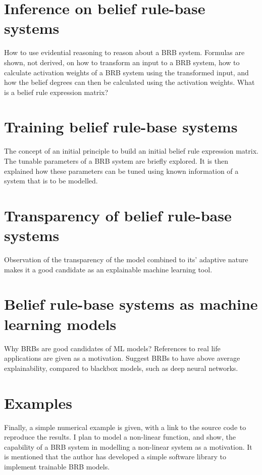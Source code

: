 \section{Inference on belief rule-base systems}
{\color{red}
How to use evidential reasoning to reason about a BRB system. Formulas are shown, not derived, on how to transform an input to a BRB system,
how to calculate activation weights of
a BRB system using the transformed input, and how the belief degrees can then be calculated using the activation weights. What is a belief rule expression matrix?
}

\section{Training belief rule-base systems}
{\color{red}
The concept of an initial principle to build an initial belief rule expression matrix.
The tunable parameters of a BRB system are briefly explored. It is then explained how these parameters can be tuned using known information of
a system that is to be modelled.
}

\section{Transparency of belief rule-base systems}
{\color{red}
Observation of the transparency of the model combined to its' adaptive nature makes it a good candidate as an explainable machine learning tool.
}

\section{Belief rule-base systems as machine learning models}
{\color{red}
Why BRBs are good candidates of ML models? References to real life applications are given as a motivation. Suggest BRBs to have above average explainability,
compared to blackbox models, such as deep neural networks.
}

\section{Examples}
{\color{red}
Finally, a simple numerical example is given, with a link to the source code to reproduce the results. I plan to model a non-linear function, and show,
the capability of a BRB system in modelling a non-linear system as a motivation. It is mentioned that the author has developed a simple software library to implement
trainable BRB models.
}